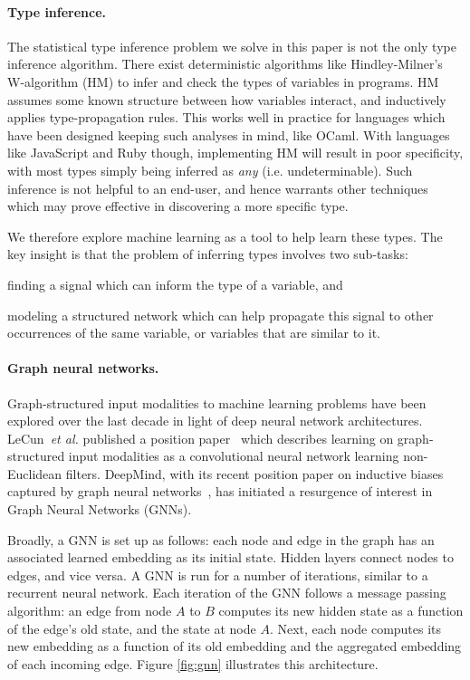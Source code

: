 \paragraph{Type inference.}
The statistical type inference problem we solve in this paper is not the only type inference algorithm.
There exist deterministic algorithms like Hindley-Milner's W-algorithm (HM) to infer and check the types of variables in programs.
HM assumes some known structure between how variables interact, and inductively applies type-propagation rules.
This works well in practice for languages which have been designed keeping such analyses in mind, like OCaml.
With languages like JavaScript and Ruby though, implementing HM will result in poor specificity, with most types simply being inferred as \textit{any} (i.e. undeterminable).
Such inference is not helpful to an end-user, and hence warrants other techniques which may prove effective in discovering a more specific type.

We therefore explore machine learning as a tool to help learn these types.
The key insight is that the problem of inferring types involves two sub-tasks:
\begin{enumerate*}[label=(\roman*)]
\item finding a signal which can inform the type of a variable, and
\item modeling a structured network which can help propagate this signal to other occurrences of the same variable, or variables that are similar to it.
\end{enumerate*}

\paragraph{Graph neural networks.}
Graph-structured input modalities to machine learning problems have been explored over the last decade in light of deep neural network architectures.
LeCun~\textit{et al.} published a position paper~\cite{henaff2015deep} which describes learning on graph-structured input modalities as a convolutional neural network learning non-Euclidean filters.
DeepMind, with its recent position paper on inductive biases captured by graph neural networks~\cite{deepmind2018graph}, has initiated a resurgence of interest in Graph Neural Networks (GNNs).

Broadly, a GNN is set up as follows: each node and edge in the graph has an associated learned embedding as its initial state.
Hidden layers connect nodes to edges, and vice versa.
A GNN is run for a number of iterations, similar to a recurrent neural network.
Each iteration of the GNN follows a message passing algorithm: an edge from node $A$ to $B$ computes its new hidden state as a function of the edge's old state, and the state at node $A$.
Next, each node computes its new embedding as a function of its old embedding and the aggregated embedding of each incoming edge.
Figure \ref{fig:gnn} illustrates this architecture.

